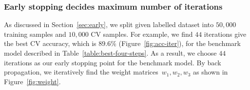 \subsubsection{Early stopping decides maximum number of iterations}
As discussed in Section~\ref{sec:early}, we split given labelled dataset into $50,000$ training samples and $10,000$ CV samples. For example, we find $44$ iterations give the best CV accuracy, which is $89.6\%$ (Figure~\ref{fig:acc-iter}), for the benchmark model described in Table~\ref{table:best-four-steps}. As a result, we choose $44$ iterations as our early stopping point for the benchmark model. By back propagation, we iteratively find the weight matrices~$w_1,w_2,w_3$ as shown in Figure~\ref{fig:weight}.
